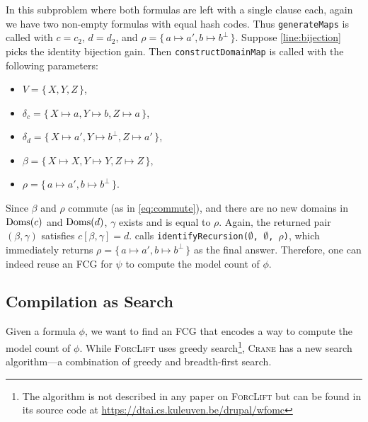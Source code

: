 \begin{example}
  In this subproblem where both formulas are left with a single clause each,
  again we have two non-empty formulas with equal hash codes. Thus
  \texttt{generateMaps} is called with $c = c_2$, $d = d_2$, and
  $\rho = \{\, a \mapsto a', b \mapsto b^\bot \,\}$. Suppose
  \cref{line:bijection} picks the identity bijection gain. Then
  \texttt{constructDomainMap} is called with the following parameters:
  \begin{itemize}
    \item $V = \{\, X, Y, Z \,\}$,
    \item $\delta_c = \{\, X \mapsto a, Y \mapsto b, Z \mapsto a \,\}$,
    \item $\delta_d = \{\, X \mapsto a', Y \mapsto b^\bot, Z \mapsto a' \,\}$,
    \item $\beta = \{\, X \mapsto X, Y \mapsto Y, Z \mapsto Z \,\}$,
    \item $\rho = \{\, a \mapsto a', b \mapsto b^\bot \,\}$.
  \end{itemize}
  Since $\beta$ and $\rho$ commute (as in \cref{eq:commute}), and there are no
  new domains in $\operatorname{Doms}(c)$ and $\operatorname{Doms}(d)$, $\gamma$ exists and is equal to
  $\rho$. Again, the returned pair $(\beta, \gamma)$ satisfies
  $c[\beta, \gamma] = d$.  calls
  \texttt{identifyRecursion($\emptyset$, $\emptyset$, $\rho$)}, which
  immediately returns $\rho = \{\, a \mapsto a', b \mapsto b^\bot \,\}$ as the
  final answer. Therefore, one can indeed reuse an FCG for $\psi$ to compute the
  model count of $\phi$.
\end{example}

\subsection{Compilation as Search}\label{sec:search}

Given a formula $\phi$, we want to find an FCG that encodes a way to compute the
model count of $\phi$. While \textsc{ForcLift}
\citep{DBLP:conf/ijcai/BroeckTMDR11} uses greedy search\footnote{The algorithm
  is not described in any paper on \textsc{ForcLift} but can be found in its
  source code at \url{https://dtai.cs.kuleuven.be/drupal/wfomc}}, \textsc{Crane}
has a new search algorithm---a combination of greedy and breadth-first search.

